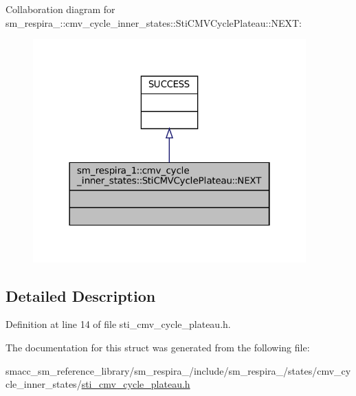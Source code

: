 Collaboration diagram for sm\+\_\+respira\+\_\+:\+:cmv\+\_\+cycle\+\_\+inner\+\_\+states\+:\+:Sti\+C\+M\+V\+Cycle\+Plateau\+:\+:N\+E\+XT\+:
\nopagebreak
\begin{figure}[H]
\begin{center}
\leavevmode
\includegraphics[width=298pt]{structsm__respira__1_1_1cmv__cycle__inner__states_1_1StiCMVCyclePlateau_1_1NEXT__coll__graph}
\end{center}
\end{figure}


\subsection{Detailed Description}


Definition at line 14 of file sti\+\_\+cmv\+\_\+cycle\+\_\+plateau.\+h.



The documentation for this struct was generated from the following file\+:\begin{DoxyCompactItemize}
\item 
smacc\+\_\+sm\+\_\+reference\+\_\+library/sm\+\_\+respira\+\_/include/sm\+\_\+respira\+\_/states/cmv\+\_\+cycle\+\_\+inner\+\_\+states/\hyperlink{sti__cmv__cycle__plateau_8h}{sti\+\_\+cmv\+\_\+cycle\+\_\+plateau.\+h}\end{DoxyCompactItemize}
